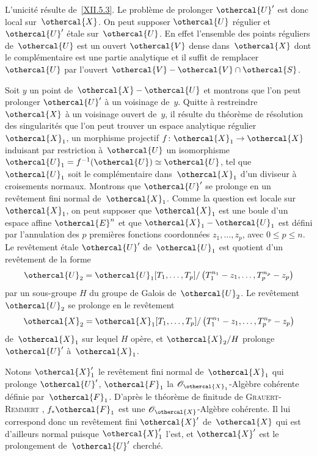 L'unicit\'e r\'esulte de~\ref{XII.5.3}. Le probl\`eme de
prolonger $\othercal{U}'$ est donc local sur~$\othercal{X}$. On peut supposer
$\othercal{U}$ r\'egulier et $\othercal{U}'$ \'etale sur~$\othercal{U}$. En
effet l'ensemble des points r\'eguliers de~$\othercal{U}$ est un ouvert
$\othercal{V}$ dense dans~$\othercal{X}$ dont le compl\'ementaire est une
partie analytique \hbox{\cite[~D th.\, 2]{XII.4}} et il suffit de remplacer
$\othercal{U}$ par l'ouvert $\othercal{V}-\othercal{V}\cap\othercal{S}$.

Soit $y$ un point de~$\othercal{X}-\othercal{U}$ et montrons que l'on peut
prolonger $\othercal{U}'$ \`a un voisinage de~$y$. Quitte \`a
restreindre $\othercal{X}$ \`a un voisinage ouvert de~$y$, il
r\'esulte du th\'eor\`eme de r\'esolution des singularit\'es
\cite{XII.8} que l'on peut trouver un espace analytique r\'egulier
$\othercal{X}_1$, un morphisme projectif $f\colon\othercal{X}_1\to\othercal{X}$
induisant par restriction \`a~$\othercal{U}$ un isomorphisme
$\othercal{U}_1=f^{-1}(\othercal{U})\simeq\othercal{U}$, tel que $\othercal{U}_1$ soit
le compl\'ementaire dans~$\othercal{X}_1$ d'un diviseur \`a
croisements normaux. Montrons que $\othercal{U}'$ se prolonge en un
rev\^etement fini normal de~$\othercal{X}_1$. Comme la question est
locale sur~$\othercal{X}_1$, on peut supposer que $\othercal{X}_1$ est une
boule d'un espace affine $\othercal{E}^n$ et que $\othercal{X}_1-\othercal{U}_1$
est d\'efini par l'annulation des $p$ premi\`eres fonctions
coordonn\'ees
$z_1,\dots,z_p$,
avec $0\leq p\leq n$. Le rev\^etement \'etale $\othercal{U}'$
de~$\othercal{U}_1$ est quotient d'un rev\^etement de la forme
$$
\othercal{U}_2=\othercal{U}_1[T_1,\dots,T_p]/\left(T_1^{n_1}-z_1,\dots,
T_p^{n_p}-z_p\right)
$$
par un sous-groupe $H$ du groupe de Galois de~$\othercal{U}_2$. Le
rev\^etement $\othercal{U}_2$ se prolonge
en le rev\^etement
$$
\othercal{X}_2=\othercal{X}_1[T_1,\dots,T_p]/\left(T_1^{n_1}-z_1,\dots,
T_p^{n_p}-z_p\right)
$$
de~$\othercal{X}_1$ sur lequel $H$ op\`ere, et $\othercal{X}_2/H$ prolonge
$\othercal{U}'$ \`a~$\othercal{X}_1$.

Notons $\othercal{X}_1'$ le rev\^etement fini normal de~$\othercal{X}_1$ qui
prolonge $\othercal{U}'$, $\othercal{F}_1$ la
$\cal{O}_{\othercal{X}_1}$-Alg\`ebre coh\'erente d\'efinie
par~$\othercal{F}_1$. D'apr\`es le th\'eor\`eme de finitude de
\textsc{Grauert}-\textsc{Remmert} \hbox{\cite[ th.\, 1.1]{XII.4}}, $f_*\othercal{F}_1$ est une
$\cal{O}_{\othercal{X}}$-Alg\`ebre coh\'erente. Il lui correspond donc
un rev\^etement fini $\othercal{X}'$ de~$\othercal{X}$ qui est d'ailleurs
normal puisque $\othercal{X}_1'$ l'est, et $\othercal{X}'$ est le prolongement
de~$\othercal{U}'$ cherch\'e.

